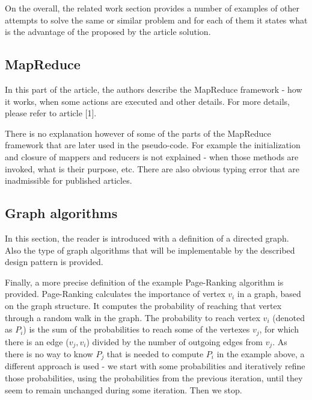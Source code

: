 \documentclass[12pt]{article}
\theoremstyle{plain}
\begin{document}
  On the overall, the related work section provides a number of examples of 
  other attempts to solve the same or similar problem and for each of them it
  states what is the advantage of the proposed by the article solution.

\subsection{MapReduce} %
\label{sub:MapReduce}
  In this part of the article, the authors describe the MapReduce framework -
  how it works, when some actions are executed and other details. For more
  details, please refer to article [1].
  
  There is no explanation however of some of the parts of the MapReduce
  framework that are later used in the pseudo-code. For example the
  initialization and closure of mappers and reducers is not explained - when
  those methods are invoked, what is their purpose, etc. There are also obvious
  typing error that are inadmissible for published articles.  

\subsection{Graph algorithms} %
\label{sub:Graph algorithms}
  In this section, the reader is introduced with a definition of a directed
  graph. Also the type of graph algorithms that will be implementable by the
  described design pattern is provided.

  Finally, a more precise definition of the example Page-Ranking algorithm is 
  provided. Page-Ranking calculates the importance of vertex $v_i$ in a graph,
  based on the graph structure. It computes the probability of reaching that 
  vertex through a random walk in the graph. The probability to reach vertex
  $v_i$ (denoted as $P_i$) is the sum of the probabilities to reach some of 
  the vertexes $v_j$, for which there is an edge ($v_j, v_i$) divided by the 
  number of outgoing edges from $v_j$. As there is no way to know $P_j$ that is
  needed to compute $P_i$ in the example above, a different approach is used - 
  we start with some probabilities and iteratively refine those probabilities,
  using the probabilities from the previous iteration, until they seem to
  remain unchanged during some iteration. Then we stop.
\end{document}
